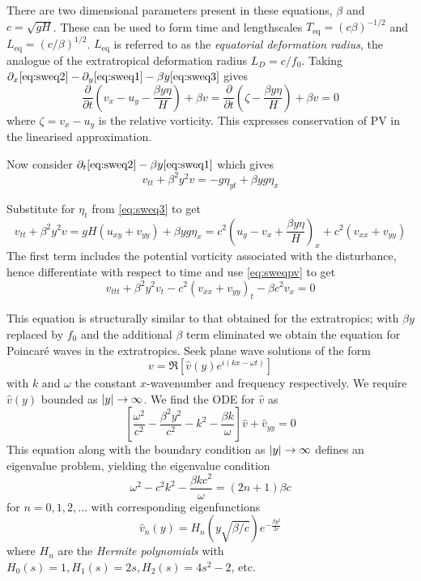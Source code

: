\documentclass{jknotes}
\begin{document}
There are two dimensional parameters present in these equations, $\beta$ and
$c = \sqrt{gH}$. These can be used to form time and lengthscales
$T_{\text{eq}} = (c\beta)^{-1/2}$ and $L_{\text{eq}} = (c/\beta)^{1/2}$.
$L_{\text{eq}}$ is referred to as the \emph{equatorial deformation radius},
the analogue of the extratropical deformation radius $L_D = c/f_0$. Taking
$\partial_x \eqref{eq:sweq2} - \partial_y \eqref{eq:sweq1} - \beta y
\eqref{eq:sweq3}$ gives
\begin{equation}
	\frac{\partial}{\partial t} (v_x - u_y - \frac{\beta y \eta}{H}) + \beta v
	= \frac{\partial}{\partial t} ( \zeta - \frac{\beta y \eta}{H}) + \beta v
	= 0 \label{eq:sweqpv}
\end{equation}
where $\zeta = v_x - u_y$ is the relative vorticity. This expresses
conservation of PV in the linearised approximation.

Now consider $\partial_t \eqref{eq:sweq2} - \beta y \eqref{eq:sweq1}$ which
gives
\begin{equation}
	v_{tt} + \beta^2 y^2 v = -g \eta_{yt} + \beta y g \eta_x
\end{equation}

Substitute for $\eta_t$ from \eqref{eq:sweq3} to get
\begin{equation}
	v_{tt} + \beta^2 y^2 v = gH (u_{xy} + v_{yy}) + \beta y g \eta_x = c^2
	(u_y - v_x + \frac{\beta y \eta}{H})_x + c^2 (v_{xx} + v_{yy})
\end{equation}
The first term includes the potential vorticity associated with the
disturbance, hence differentiate with respect to time and use
\eqref{eq:sweqpv} to get
\begin{equation}
	v_{ttt} + \beta^2 y^2 v_t - c^2 (v_{xx} + v_{yy})_t - \beta c^2 v_x = 0
\end{equation}

This equation is structurally similar to that obtained for the extratropics;
with $\beta y$ replaced by $f_0$ and the additional $\beta$ term eliminated
we obtain the equation for Poincar\'{e} waves in the extratropics. Seek plane
wave solutions of the form
\begin{equation}
	v = \Re\left[ \hat{v}(y) e^{i(kx-\omega t)} \right]
\end{equation}
with $k$ and $\omega$ the constant $x$-wavenumber and frequency respectively.
We require $\hat{v}(y)$ bounded as $\abs{y} \to \infty$. We find the ODE for
$\hat{v}$ as
\begin{equation}
	\left[ \frac{\omega^2}{c^2} - \frac{\beta^2 y^2}{c^2} - k^2 - \frac{\beta
	k}{\omega} \right] \hat{v} + \hat{v}_{yy} = 0
\end{equation}
This equation along with the boundary condition as $\abs{y} \to \infty$
defines an eigenvalue problem, yielding the eigenvalue condition
\begin{equation}
	\omega^2 - c^2 k^2 - \frac{\beta k c^2}{\omega} = (2n+1) \beta c
\end{equation}
for $n = 0, 1, 2, \dots$ with corresponding eigenfunctions
\begin{equation}
	\hat{v}_n(y) = H_n( y\sqrt{\beta/c}) e^{-\frac{\beta y^2}{2c}}
\end{equation}
where $H_n$ are the \emph{Hermite polynomials} with $H_0(s) = 1, H_1(s) = 2s,
H_2(s) = 4s^2 - 2$, etc.
\end{document}
